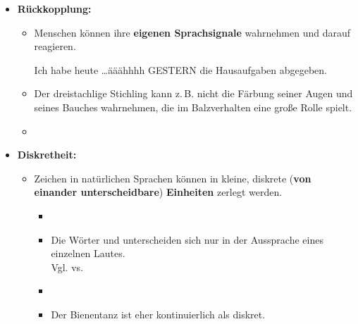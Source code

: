 \begin{frame}
	
\begin{itemize}
	\item<1-> \textbf{Rückkopplung:}
	
	\begin{itemize}
		\item<1-> Menschen können ihre \textbf{eigenen Sprachsignale} wahrnehmen und darauf reagieren.
		
\ea Ich habe heute \dots ääähhhh GESTERN die Hausaufgaben abgegeben.
\z

		\item<2->[$\rightarrow$] Der dreistachlige Stichling kann z.\,B. nicht die Färbung seiner Augen und seines Bauches wahrnehmen, die im Balzverhalten eine große Rolle spielt.
			\item[]
		\end{itemize}
			
	\item<3-> \textbf{Diskretheit:}
			
	\begin{itemize}
		\item<3-> Zeichen in natürlichen Sprachen können in kleine, diskrete (\textbf{von einander unterscheidbare}) \textbf{Einheiten} zerlegt werden.
				
		\begin{itemize}
			\item[]
			\item<4->[$\rightarrow$] Die Wörter und  unterscheiden sich nur in der Aussprache eines einzelnen Lautes.\\
					Vgl.  vs. 
			\item[]
			\item<4->[$\rightarrow$] Der Bienentanz ist eher kontinuierlich als diskret.						
		\end{itemize}
	
	\end{itemize}

\end{itemize}

\end{frame}



